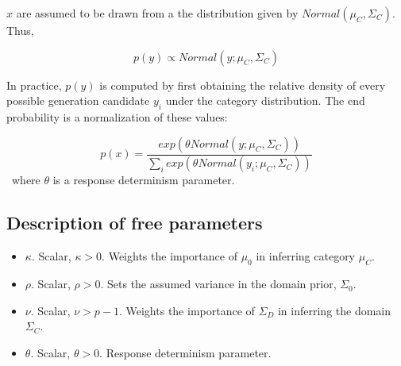 \documentclass[12pt]{article}
\begin{document}
$x$ are assumed to be drawn from a the distribution given by $Normal(\mu_{C}, \Sigma_{C})$. Thus, 


\begin{equation}
  p(y) \propto Normal(y; \mu_{C}, \Sigma_{C})
\end{equation}

In practice, $p(y)$ is computed by first obtaining the relative density of every possible generation candidate $y_i$ under the category distribution. The end probability is a normalization of these values:

\begin{equation}
  p(x) = \dfrac
    {exp( \theta Normal(y ; \mu_{C}, \Sigma_{C}))}
    {\sum_i exp( \theta Normal(y_i ; \mu_{C}, \Sigma_{C}))} 
\end{equation}
\
where $\theta$ is a response determinism parameter.

\subsection*{Description of free parameters}

\begin{itemize}
    \setlength\itemsep{-0.5em}
    \item $\kappa$. Scalar, $\kappa>0$. Weights the importance of $\mu_{0}$ in inferring category $\mu_{C}$.
    \item $\rho$. Scalar, $\rho>0$. Sets the assumed variance in the domain prior, $\Sigma_{0}$.
    \item $\nu$. Scalar, $\nu > p-1$. Weights the importance of $\Sigma_{D}$ in inferring the domain $\Sigma_{C}$.
    \item $\theta$. Scalar, $\theta > 0$. Response determinism parameter.
\end{itemize}
\end{document}
